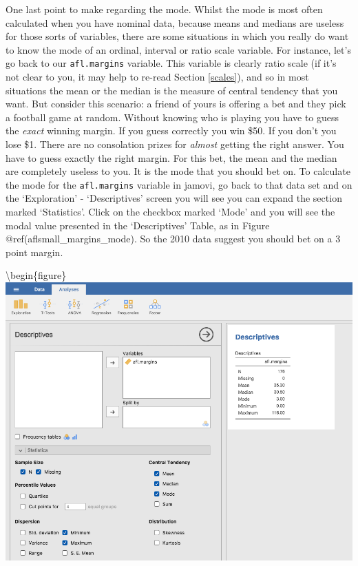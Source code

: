 \documentclass[
]{book}
\begin{document}
One last point to make regarding the mode. Whilst the mode is most often calculated when you have nominal data, because means and medians are useless for those sorts of variables, there are some situations in which you really do want to know the mode of an ordinal, interval or ratio scale variable. For instance, let's go back to our \texttt{afl.margins} variable. This variable is clearly ratio scale (if it's not clear to you, it may help to re-read Section \ref{scales}), and so in most situations the mean or the median is the measure of central tendency that you want. But consider this scenario: a friend of yours is offering a bet and they pick a football game at random. Without knowing who is playing you have to guess the \emph{exact} winning margin. If you guess correctly you win \$50. If you don't you lose \$1. There are no consolation prizes for \emph{almost} getting the right answer. You have to guess exactly the right margin. For this bet, the mean and the median are completely useless to you. It is the mode that you should bet on. To calculate the mode for the \texttt{afl.margins} variable in jamovi, go back to that data set and on the `Exploration' - `Descriptives' screen you will see you can expand the section marked `Statistics'. Click on the checkbox marked `Mode' and you will see the modal value presented in the `Descriptives' Table, as in Figure @ref(aflsmall\_margins\_mode). So the 2010 data suggest you should bet on a 3 point margin.

\textbackslash begin\{figure\}
\includegraphics[width=13.32in]{img/descriptives/aflsmall_margins_mode}
\end{document}
